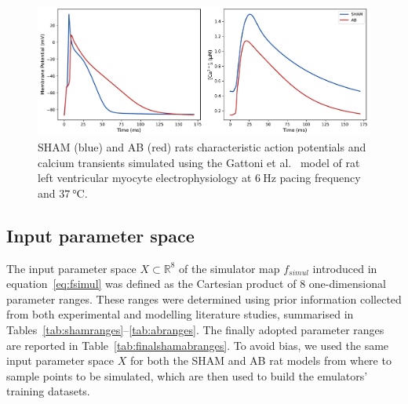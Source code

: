 \begin{figure}[!ht]
    \myfloatalign
    \includegraphics[width=\textwidth]{figures/chapter02/sham_vs_ab_ca_ap.pdf}
    \caption{SHAM (blue) and AB (red) rats characteristic action potentials and calcium transients simulated using the Gattoni et al.~\cite{Gattoni:2017} model of rat left ventricular myocyte electrophysiology at $\SI{6}{\hertz}$ pacing frequency and $\SI{37}{\celsius}$.}
    \label{fig:shamvsabcaap}
\end{figure}


%
%
%
\subsection{Input parameter space}\label{sec:ch4inputparameterspace}
The input parameter space $X\subset\mathbb{R}^{8}$ of the simulator map $f_{simul}$ introduced in equation~\eqref{eq:fsimul} was defined as the Cartesian product of $8$ one-dimensional parameter ranges. These ranges were determined using prior information collected from both experimental and modelling literature studies, summarised in Tables~\ref{tab:shamranges}--\ref{tab:abranges}. The finally adopted parameter ranges are reported in Table~\ref{tab:finalshamabranges}. To avoid bias, we used the same input parameter space $X$ for both the SHAM and AB rat models from where to sample points to be simulated, which are then used to build the emulators' training datasets.

